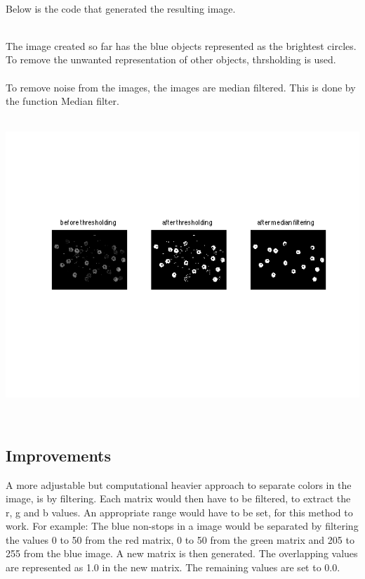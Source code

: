 \\
Below is the code that generated the resulting image. 

\\
The image created so far has the blue objects represented as the brightest circles. To remove the unwanted representation of other objects, thrsholding is used.
\\

\\
To remove noise from the images, the images are median filtered. This is done by the function Median filter. 
\\

\\
\centerline{\includegraphics[clip=true, trim=40 100 40 80]{separate_step3_1.png}}
\\

\subsection{Improvements}
A more adjustable but computational heavier approach to separate colors in the image, is by filtering. Each matrix would then have to be filtered, to extract the r, g and b values. An appropriate range would have to be set, for this method to work. For example: The blue non-stops in a image would be separated by filtering the values 0 to 50 from the red matrix, 0 to 50 from the green matrix and 205 to 255 from the blue image. A new matrix is then generated. The overlapping values are represented as 1.0 in the new matrix. The remaining values are set to 0.0. 
\\



